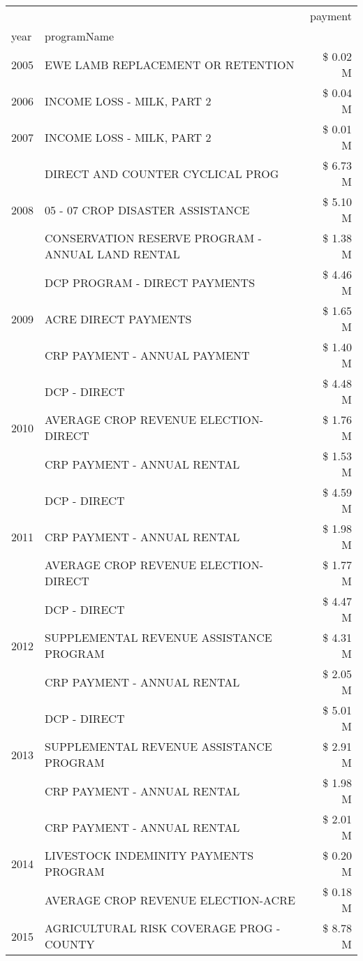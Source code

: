 \begin{tabular}{llr}
\toprule
 &  & payment \\
year & programName &  \\
\midrule
2005 & EWE LAMB REPLACEMENT OR RETENTION & \$ 0.02 M \\
\cline{1-3}
2006 & INCOME LOSS - MILK, PART 2 & \$ 0.04 M \\
\cline{1-3}
2007 & INCOME LOSS - MILK, PART 2 & \$ 0.01 M \\
\cline{1-3}
\multirow[t]{3}{*}{2008} & DIRECT AND COUNTER CYCLICAL PROG & \$ 6.73 M \\
 & 05 - 07 CROP DISASTER ASSISTANCE & \$ 5.10 M \\
 & CONSERVATION RESERVE PROGRAM - ANNUAL LAND RENTAL & \$ 1.38 M \\
\cline{1-3}
\multirow[t]{3}{*}{2009} & DCP PROGRAM - DIRECT PAYMENTS & \$ 4.46 M \\
 & ACRE DIRECT PAYMENTS & \$ 1.65 M \\
 & CRP PAYMENT - ANNUAL PAYMENT & \$ 1.40 M \\
\cline{1-3}
\multirow[t]{3}{*}{2010} & DCP - DIRECT & \$ 4.48 M \\
 & AVERAGE CROP REVENUE ELECTION-DIRECT & \$ 1.76 M \\
 & CRP PAYMENT - ANNUAL RENTAL & \$ 1.53 M \\
\cline{1-3}
\multirow[t]{3}{*}{2011} & DCP - DIRECT & \$ 4.59 M \\
 & CRP PAYMENT - ANNUAL RENTAL & \$ 1.98 M \\
 & AVERAGE CROP REVENUE ELECTION-DIRECT & \$ 1.77 M \\
\cline{1-3}
\multirow[t]{3}{*}{2012} & DCP - DIRECT & \$ 4.47 M \\
 & SUPPLEMENTAL REVENUE ASSISTANCE PROGRAM & \$ 4.31 M \\
 & CRP PAYMENT - ANNUAL RENTAL & \$ 2.05 M \\
\cline{1-3}
\multirow[t]{3}{*}{2013} & DCP - DIRECT & \$ 5.01 M \\
 & SUPPLEMENTAL REVENUE ASSISTANCE PROGRAM & \$ 2.91 M \\
 & CRP PAYMENT - ANNUAL RENTAL & \$ 1.98 M \\
\cline{1-3}
\multirow[t]{3}{*}{2014} & CRP PAYMENT - ANNUAL RENTAL & \$ 2.01 M \\
 & LIVESTOCK INDEMINITY PAYMENTS PROGRAM & \$ 0.20 M \\
 & AVERAGE CROP REVENUE ELECTION-ACRE & \$ 0.18 M \\
\cline{1-3}
\multirow[t]{3}{*}{2015} & AGRICULTURAL RISK COVERAGE PROG - COUNTY & \$ 8.78 M \\

\end{tabular}
